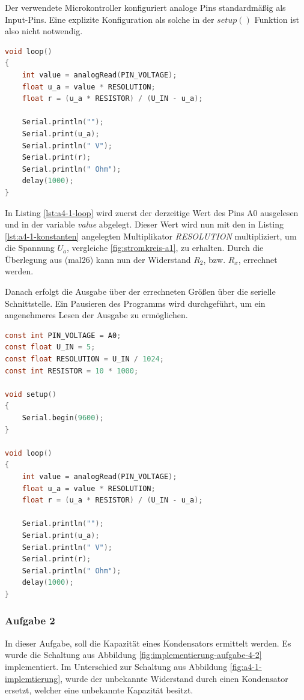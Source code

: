 Der verwendete Microkontroller konfiguriert analoge Pins standardmäßig als Input-Pins.
Eine explizite Konfiguration als solche in der $setup()$ Funktion ist also nicht notwendig.

\begin{lstlisting}[language=C,label={lst:a4-1-loop}, caption={Programmschleife der Aufgabe 4.1}]
void loop()
{
    int value = analogRead(PIN_VOLTAGE);
    float u_a = value * RESOLUTION;
    float r = (u_a * RESISTOR) / (U_IN - u_a);

    Serial.println("");
    Serial.print(u_a);
    Serial.println(" V");
    Serial.print(r);
    Serial.println(" Ohm");
    delay(1000);
}
\end{lstlisting}

In Listing \ref{lst:a4-1-loop} wird zuerst der derzeitige Wert des Pins A0 ausgelesen und in der variable \textit{value} abgelegt.
Dieser Wert wird nun mit den in Listing \ref{lst:a4-1-konstanten} angelegten Multiplikator \textit{RESOLUTION} multipliziert, um die Spannung $U_a$, vergleiche \ref{fig:stromkreis-a1}, zu erhalten.
Durch die Überlegung aus (mal26) kann nun der Widerstand $R_2$, bzw. $R_x$, errechnet werden.

Danach erfolgt die Ausgabe über der errechneten Größen über die serielle Schnittstelle.
Ein Pausieren des Programms wird durchgeführt, um ein angenehmeres Lesen der Ausgabe zu ermöglichen.

\begin{lstlisting}[language=C,label={lst:a4-1-programmcode}, caption={Vollständiger Programmcode der Aufgabe 4.1}]
const int PIN_VOLTAGE = A0;
const float U_IN = 5;
const float RESOLUTION = U_IN / 1024;
const int RESISTOR = 10 * 1000;

void setup()
{
    Serial.begin(9600);
}

void loop()
{
    int value = analogRead(PIN_VOLTAGE);
    float u_a = value * RESOLUTION;
    float r = (u_a * RESISTOR) / (U_IN - u_a);

    Serial.println("");
    Serial.print(u_a);
    Serial.println(" V");
    Serial.print(r);
    Serial.println(" Ohm");
    delay(1000);
}
\end{lstlisting}

\subsubsection{Aufgabe 2}

In dieser Aufgabe, soll die Kapazität eines Kondensators ermittelt werden.
Es wurde die Schaltung aus Abbildung \ref{fig:implementierung-aufgabe-4-2} implementiert.
Im Unterschied zur Schaltung aus Abbildung \ref{fig:a4-1-implemtierung}, wurde der unbekannte Widerstand durch einen Kondensator ersetzt, welcher eine unbekannte Kapazität besitzt.

